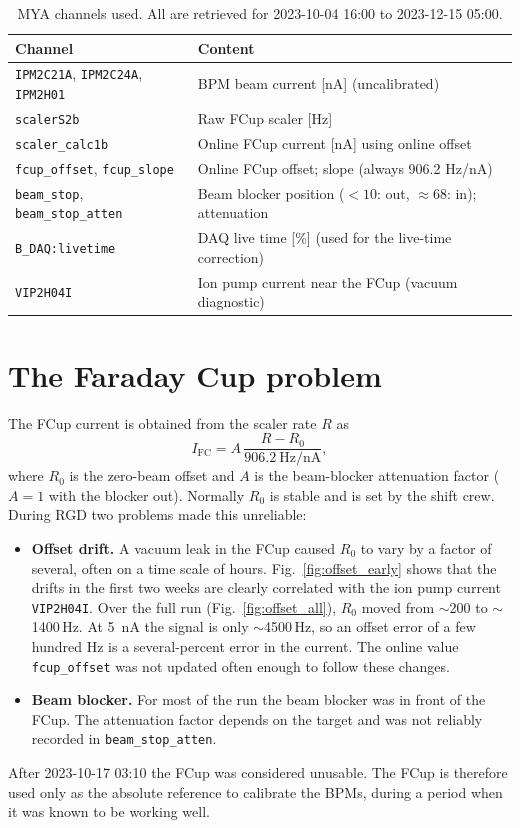 \documentclass[11pt]{article}
\newcommand{\code}[1]{\texttt{#1}}
\begin{document}
\begin{table}[H]
\centering
\caption{MYA channels used. All are retrieved for 2023-10-04 16:00 to 2023-12-15 05:00.}
\label{tab:channels}
\begin{tabular}{ll}
\toprule
Channel & Content \\
\midrule
\code{IPM2C21A}, \code{IPM2C24A}, \code{IPM2H01} & BPM beam current [nA] (uncalibrated) \\
\code{scalerS2b} & Raw FCup scaler [Hz] \\
\code{scaler\_calc1b} & Online FCup current [nA] using online offset \\
\code{fcup\_offset}, \code{fcup\_slope} & Online FCup offset; slope (always 906.2 Hz/nA) \\
\code{beam\_stop}, \code{beam\_stop\_atten} & Beam blocker position ($<10$: out, $\approx 68$: in); attenuation \\
\code{B\_DAQ:livetime} & DAQ live time [\%] (used for the live-time correction) \\
\code{VIP2H04I} & Ion pump current near the FCup (vacuum diagnostic) \\
\bottomrule
\end{tabular}
\end{table}

\section{The Faraday Cup problem}
The FCup current is obtained from the scaler rate $R$ as
\begin{equation}
  I_\mathrm{FC} = A \, \frac{R - R_0}{906.2\ \mathrm{Hz/nA}},
\end{equation}
where $R_0$ is the zero-beam offset and $A$ is the beam-blocker attenuation factor
($A=1$ with the blocker out). Normally $R_0$ is stable and is set by the shift crew. During RGD
two problems made this unreliable:
\begin{itemize}
  \item \textbf{Offset drift.} A vacuum leak in the FCup caused $R_0$ to vary by a factor of
        several, often on a time scale of hours. Fig.~\ref{fig:offset_early} shows that the drifts
        in the first two weeks are clearly correlated with the ion pump current \code{VIP2H04I}.
        Over the full run (Fig.~\ref{fig:offset_all}), $R_0$ moved from $\sim$200 to $\sim$1400\,Hz.
        At \SI{5}{\nano\ampere} the signal is only $\sim$4500\,Hz, so an offset error of a few hundred Hz is a
        several-percent error in the current. The online value \code{fcup\_offset} was not updated
        often enough to follow these changes.
  \item \textbf{Beam blocker.} For most of the run the beam blocker was in front of the FCup.
        The attenuation factor depends on the target and was not reliably recorded in
        \code{beam\_stop\_atten}.
\end{itemize}
After 2023-10-17 03:10 the FCup was considered unusable. The FCup is therefore used only as
the absolute reference to calibrate the BPMs, during a period when it was known to be working well.
\end{document}
